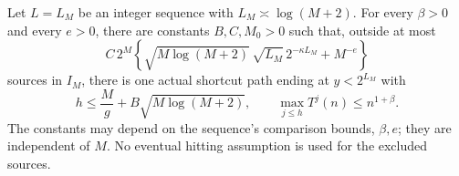\begin{theorem}
\label{thm:Shaik-shell-drift}
Let \(L=L_M\) be an integer sequence with \(L_M\asymp\log(M+2)\).
For every \(\beta>0\) and every \(e>0\), there are constants
\(B,C,M_0>0\) such that, outside at most
\begin{equation}\label{eq:Shaik-shell-reconstruction}
 C\,2^M\left\{\sqrt{M\log(M+2)}\,\sqrt{L_M}\,
                   2^{-\kappa L_M}+M^{-e}\right\}
\end{equation}
sources in \(I_M\), there is one actual shortcut path ending at \(y<2^{L_M}\)
with
\begin{equation}\label{eq:Shaik-drift-clock}
 h\le \frac M g+B\sqrt{M\log(M+2)},\qquad
 \max_{j\le h}T^j(n)\le n^{1+\beta}.
\end{equation}
The constants may depend on the sequence's comparison bounds, \(\beta,e\);
they are independent of \(M\). No eventual hitting assumption is used
for the excluded sources.
\end{theorem}
